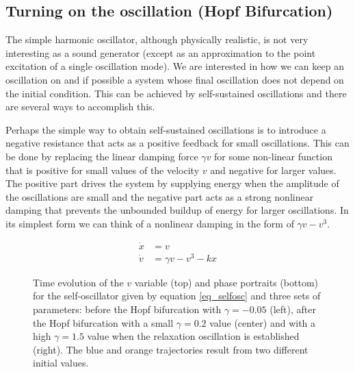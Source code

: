 \documentclass{article}
\begin{document}
\subsection{Turning on the oscillation (Hopf Bifurcation)}

The simple harmonic oscillator, although physically realistic, is not very interesting as a sound generator (except as an approximation to the point excitation of a single oscillation mode). 
We are interested in how we can keep an oscillation on and if possible a system whose final oscillation does not depend on the initial condition. 
This can be achieved by self-sustained oscillations and there are several ways to accomplish this. 

Perhaps the simple way to obtain self-sustained oscillations is to introduce a negative resistance that acts as a positive feedback for small oscillations.
This can be done by replacing the linear damping force $\gamma v$ for some non-linear function that is positive for small values of the velocity $v$ and negative for larger values.
The positive part drives the system by supplying energy when the amplitude of the oscillations are small and the negative part acts as a strong nonlinear damping that prevents the unbounded buildup of energy for larger oscillations. 
In its simplest form we can think of a nonlinear damping in the form of $\gamma v - v ^ 3$.

\begin{subequations} \label{eq_selfosc}
\begin{align}
    \dot{x} & = v \\
    \dot{v} & = \gamma v - v^3 -kx 
\end{align}
\end{subequations}


\begin{figure}
    \centering
    \caption{Time evolution of the $v$ variable (top) and phase portraits (bottom) for the self-oscillator given by equation \ref{eq_selfosc} and three sets of parameters: before the Hopf bifurcation with $\gamma=-0.05$ (left), after the Hopf bifurcation with a small $\gamma=0.2$ value (center) and with a high $\gamma=1.5$ value when the relaxation oscillation is established (right). The blue and orange trajectories result from two different initial values.} 
    \label{fig_selfosc}
\end{figure}
\end{document}
